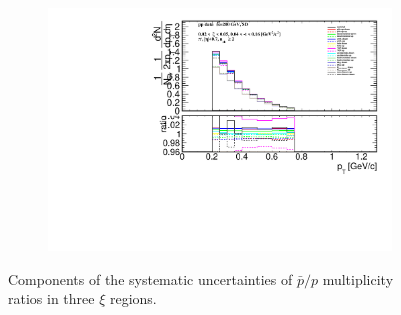 \begin{figure}[h!]
\begin{subfigure}{.49\textwidth}
		\includegraphics[width=\textwidth,page=27]{chapters/chrgSTAR/img/syst/outPID_SDT.pdf}
	\end{subfigure}
	\begin{minipage}{.49\textwidth}
		\caption{Components of the systematic uncertainties of $\bar{p}/p$ multiplicity ratios  in three $\xi$ regions. }
		\label{fig:results_star_syst_p}
	\end{minipage}
	\vspace{-2.5cm}
\end{figure}
\FloatBarrier
